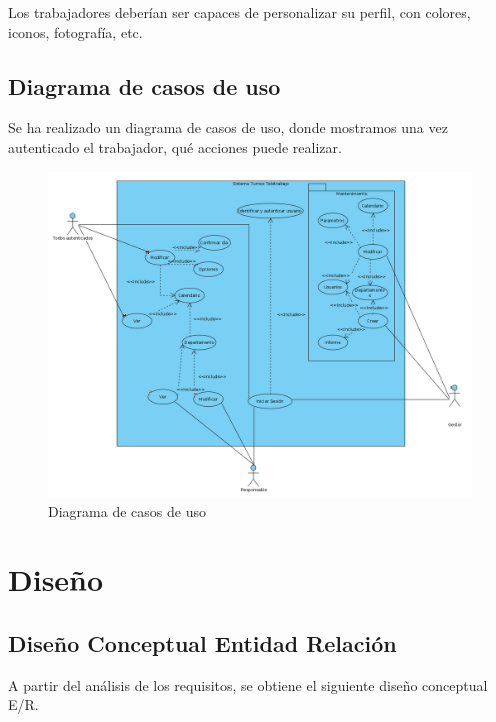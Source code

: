 \documentclass[11pt,spanish,listoffigures,listoftables]{tfgetsinf}
\begin{document}
Los trabajadores deberían ser capaces de personalizar su perfil, con colores, iconos, fotografía, etc.

\section{Diagrama de casos de uso}

Se ha realizado un diagrama de casos de uso, donde mostramos una vez autenticado el trabajador, qué acciones puede realizar.

\begin{figure}[h!] %
   \includegraphics[width=\linewidth]{img/Casos de uso.png}
   \caption{Diagrama de casos de uso}
   \label{fig:CasosUso1}
 \end{figure}

\chapter{Diseño}

\section{Diseño Conceptual Entidad Relación}
A partir del análisis de los requisitos, se obtiene el siguiente diseño conceptual E/R.
\end{document}
